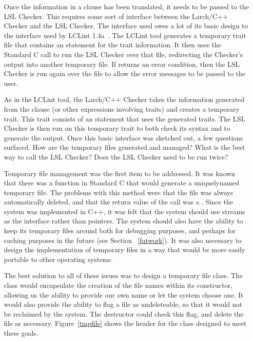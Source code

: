Once the information in a  clause has been translated,
it needs to be passed to the LSL Checker. This requires some sort of
interface between the Larch/C++ Checker and the LSL Checker. The
interface used owes a lot of its basic design to the interface used by
LCLint 1.4a~\cite{lclint}. The LCLint tool generates a temporary trait
file that contains an  statement for the trait
information. It then uses the Standard C  call to run
the LSL Checker over that file, redirecting the Checker's output into another
temporary file. If  returns an error condition, then the LSL
Checker is run again over the file to allow the error messages to be
passed to the user.

As in the LCLint tool, the Larch/C++ Checker takes the
information generated from the  clause (or other expressions
involving traits) and creates a temporary trait. This trait consists
of an
 statement that uses the generated traits. The LSL
Checker is then run on this temporary trait to both check its syntax and to
generate the  output. Once this basic interface 
was sketched out, a few questions surfaced. How are the temporary
files generated and managed? What is the best way to call the LSL
Checker? Does the LSL Checker need to be run twice?

Temporary file management was the first item to be addressed. It was
known that there was a  function in Standard C that
would generate a uniquely\-named temporary file. The problems with this method
were that the file was always automatically deleted, and that the
return value of the call was a . Since the system was
implemented in C++, it was felt that the system should use streams as
the interface rather than  pointers. The system should
also have the ability to keep its temporary files around both for
debugging purposes, and perhaps for caching purposes in the future
(see Section ~\ref{futwork}). It was also necessary to design the
implementation of temporary files in a way that would be more easily
portable to other operating systems.

The best solution to all of these issues was to design a temporary
file class. The class would encapsulate the creation of the file names
within its constructor, allowing us the ability to provide our own
name or let the system choose one. It would also provide the ability
to flag a file as undeleteable, so that it would not be reclaimed by
the system. The destructor could check this flag, and delete the file
as necessary. Figure~\ref{tmpfile} shows the header for the class
 designed to meet these goals.


